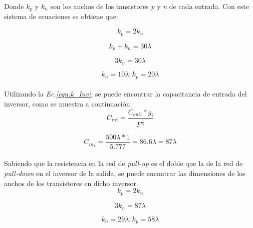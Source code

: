 \documentclass[12pt,a4paper]{article} %
\begin{document}
Donde \textit{$k_{p}$} y \textit{$k_{n}$} son los anchos de los tansistores \textit{p} y \textit{n} de cada entrada. Con este sistema de ecuaciones se obtiene que:

\begin{equation}\label{eqn:R1}
k_p = 2k_n
\end{equation}

\begin{equation}\label{eqn:k1}
k_p + k_n = 30\lambda
\end{equation}

\begin{equation}\label{eqn:k2}
3k_n = 30\lambda
\end{equation}

\begin{equation}\label{eqn:k3}
k_n = 10\lambda ; k_p = 20\lambda
\end{equation}\\

Utilizando la \textit{Ec.\ref{eqn:k_Inv}}, se puede encontrar la capacitancia de entrada del inversor, como se muestra a continuación:\\

\begin{equation}\label{eqn:k_Inv}
C_{ini}= \frac{C_{outi}*g_{i}}{F^{\frac{1}{N}}}
\end{equation}

\begin{equation}\label{eqn:k_Inv2}
{C_{in}}_{i}= \frac{500\lambda*1}{5.777} = 86.6\lambda = 87\lambda
\end{equation}\\

Sabiendo que la resistencia en la red de \textit{pull-up} es el doble que la de la red de \textit{pull-down} en el inversor de la salida, se puede encontrar las dimensiones de los anchos de los transistores en dicho inversor.\\

\begin{equation}\label{eqn:k_Inv3}
k_p=2k_n
\end{equation}

\begin{equation}\label{eqn:k_Inv4}
3k_n=87\lambda
\end{equation}

\begin{equation}\label{eqn:k_Inv5}
k_n=29\lambda ; k_p=58\lambda 
\end{equation}\\
\end{document}
